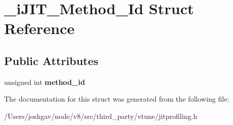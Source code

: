 \hypertarget{struct__i_j_i_t___method___id}{}\section{\+\_\+i\+J\+I\+T\+\_\+\+Method\+\_\+\+Id Struct Reference}
\label{struct__i_j_i_t___method___id}
\subsection*{Public Attributes}
\begin{DoxyCompactItemize}
\item 
unsigned int {\bfseries method\+\_\+id}\hypertarget{struct__i_j_i_t___method___id_a93a5f82a1b62815844a2b8565fcf947a}{}\label{struct__i_j_i_t___method___id_a93a5f82a1b62815844a2b8565fcf947a}

\end{DoxyCompactItemize}


The documentation for this struct was generated from the following file\+:\begin{DoxyCompactItemize}
\item 
/\+Users/joshgav/node/v8/src/third\+\_\+party/vtune/jitprofiling.\+h\end{DoxyCompactItemize}
